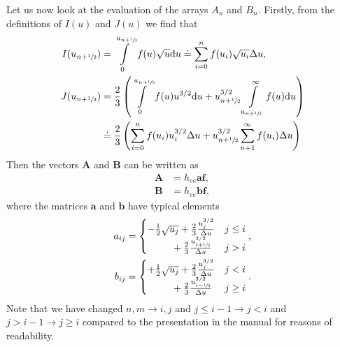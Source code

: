 \documentclass{book}
\newcommand{\frachalf}{\ensuremath{\sfrac{1}{2}}}
\newcommand{\phalf}[1]{\ensuremath{{#1}+\frachalf}}
\newcommand{\mhalf}[1]{\ensuremath{{#1}-\frachalf}}
\newcommand{\bmat}[1]{{\ensuremath{\bm {#1}}}}
\newcommand{\bvec}[1]{{\ensuremath{\bm {#1}}}}
\begin{document}
Let us now look at the evaluation of the arrays $A_n$ and $B_n$. Firstly, from the definitions
of $I(u)$ and $J(u)$ we find that
\begin{align}
	I(u_{\phalf{n}})
		&= \int\limits_0^{u_{\phalf{n}}} f(u)\sqrt{u}\dd{u}
		\doteq
		\sum\limits_{i=0}^{n}f(u_i)\sqrt{u_i}\Delta u, \\
	J(u_{\phalf{n}})
		&= \frac{2}{3}\left(
			\int\limits_0^{u_{\phalf{n}}} f(u)u^{3/2}\dd{u}
			+
			u_{\phalf{n}}^{3/2}\int\limits_{u_{\phalf{n}}}^\infty f(u)\dd{u}
		\right)
		\nonumber \\
		&\doteq
		\frac{2}{3}\left(
			\sum\limits_{i=0}^{n}f(u_i)u_i^{3/2}\Delta u
			+
			u_{\phalf{n}}^{3/2}\sum\limits_{n+1}^\infty f(u_i)\Delta u
		\right)
\end{align}
Then the vectors $\bvec{A}$ and $\bvec{B}$ can be written as
\begin{align}
	\bvec{A} &= h_{ee}\bmat{a}\bvec{f}, \label{eq:ee:A=g_eeaf} \\
	\bvec{B} &= h_{ee}\bmat{b}\bvec{f}, \label{eq:ee:B=g_eebf}
\end{align}
where the matrices $\bmat{a}$ and $\bmat{b}$ have typical elements
\begin{align}
	a_{ij} &= \begin{cases}
			-\frac{1}{2}\sqrt{u_j}          + \frac{2}{3}\frac{u_j^{3/2}}{\Delta u}	    & j \leq i \\
			\phantom{\frac{1}{2}\sqrt{u_j}} + \frac{2}{3}\frac{u_{\phalf{i}}^{3/2}}{\Delta u} & j > i
		\end{cases}, \label{eq:ee:a-orig} \\
	b_{ij} &= \begin{cases}
			+\frac{1}{2}\sqrt{u_j}          + \frac{2}{3}\frac{u_j^{3/2}}{\Delta u}	    & j < i \\
			\phantom{\frac{1}{2}\sqrt{u_j}} + \frac{2}{3}\frac{u_{\mhalf{i}}^{3/2}}{\Delta u} & j \geq i
		\end{cases}. \label{eq:ee:b-orig}
\end{align}
Note that we have changed $n,m\rightarrow i,j$ and $j\leq i-1\rightarrow j<i$ and $j>i-1\rightarrow j\geq i$
compared to the presentation in the manual for reasons of readability.
\end{document}
